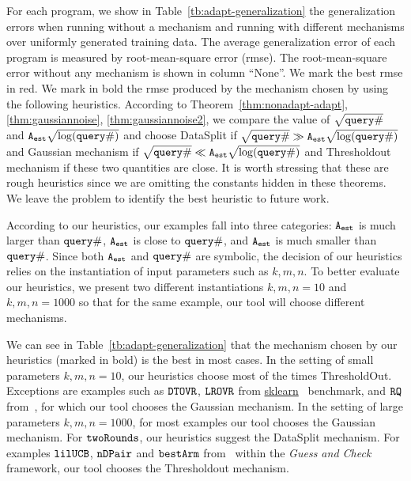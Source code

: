 {For each program, we show in Table~\ref{tb:adapt-generalization} the
generalization errors when running without a mechanism and running
with different mechanisms over uniformly generated training data.  The
average generalization error of each program is measured by
root-mean-square error (rmse).  The root-mean-square error without any
mechanism is shown in column ``None''. 
We mark the best rmse in red.
We mark in bold the rmse
produced by the mechanism chosen by {\THESYSTEM} using the following
heuristics.  According to Theorem~\ref{thm:nonadapt-adapt},\ref{thm:gaussiannoise},
\ref{thm:gaussiannoise2},
we compare the value of $\sqrt{{\tt query} \#}$ and
${\mathtt{A_{est}}}\sqrt{\log({\tt query} \#)}$ and choose DataSplit if
$\sqrt{{\tt query} \#} \gg {\ensuremath{\mathtt{A_{est}}}}\sqrt{\log({\tt query} \#)}$ and Gaussian
mechanism if $\sqrt{{\tt query} \#} \ll {\ensuremath{\mathtt{A_{est}}}}\sqrt{\log({\tt query} \#)}$ and
Thresholdout mechanism if these two quantities are close. 
 It is worth
stressing that these are rough heuristics since we are omitting the
constants hidden in these theorems. We leave the problem to identify
the best heuristic to future work.


    According to our heuristics, our examples fall into three categories: 
    ${\mathtt{A_{est}}}$ is much larger than ${\tt query} \#$, ${\mathtt{A_{est}}}$ is close to  ${\tt query} \#$,
    and ${\mathtt{A_{est}}}$ is much smaller than ${\tt query} \#$. 
    Since both ${\mathtt{A_{est}}}$ and ${\tt query} \#$ are symbolic, the decision of our heuristics relies on 
    the instantiation of input parameters such as $k,m, n$. To better evaluate our heuristics, we present two different instantiations $k,m,n=10$ and $k,m, n =1000$ so that
    for the same example, our tool will choose different mechanisms.

We can see in Table~\ref{tb:adapt-generalization} that the mechanism
chosen by our heuristics (marked in bold) is the best in most cases.
In the setting of small parameters $k,m,n=10$, our heuristics
choose most of the times ThresholdOut. Exceptions are examples such as $\mathtt{DTOVR}$,
$\mathtt{LROVR}$
from \hyperlink{https://github.com/scikit-learn/scikit-learn/tree/main/examples}{sklearn}~\cite{SklearnBenchmark}
benchmark, and $\mathtt{RQ}$ from~\cite{Jamieson2015TheAO}, for which our tool
chooses the Gaussian mechanism.  In the setting of large parameters
$k,m,n=1000$, 
for most examples our tool chooses the Gaussian mechanism.
For $\mathtt{twoRounds}$, our heuristics suggest the DataSplit mechanism. For examples $\mathtt{lilUCB}$,
$\mathtt{nDPair}$ and $\mathtt{bestArm}$ from~\cite{Jamieson2015TheAO} within
the \emph{Guess and Check}~\cite{RogersRSSTW20} framework, our tool chooses the Thresholdout mechanism.

}
